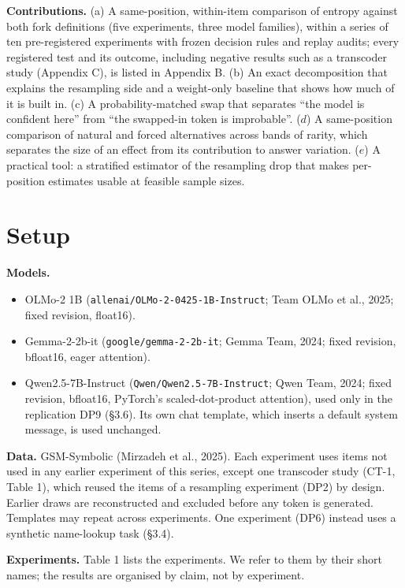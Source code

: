 \documentclass[
  10pt,
  a4paper,
]{article}
\providecommand{\tightlist}{%
  \setlength{\itemsep}{0pt}\setlength{\parskip}{0pt}}
\begin{document}
\textbf{Contributions.} (a) A same-position, within-item comparison of entropy against both fork definitions (five experiments, three model families), within a series of ten pre-registered experiments
with frozen decision rules and replay audits; every registered test and its outcome, including negative results such as a transcoder study (Appendix C), is listed in Appendix B. (b) An exact
decomposition that explains the resampling side and a weight-only baseline that shows how much of it is built in. (c) A probability-matched swap that separates ``the model is confident here'' from
``the swapped-in token is improbable''. (\(d\)) A same-position comparison of natural and forced alternatives across bands of rarity, which separates the size of an effect from its contribution to
answer variation. (\(e\)) A practical tool: a stratified estimator of the resampling drop that makes per-position estimates usable at feasible sample sizes.

\hypertarget{setup}{%
\section{Setup}\label{setup}}

\textbf{Models.}

\begin{itemize}
\tightlist
\item
  OLMo-2 1B (\texttt{allenai/OLMo-2-0425-1B-Instruct}; Team OLMo et al., 2025; fixed revision, float16).
\item
  Gemma-2-2b-it (\texttt{google/gemma-2-2b-it}; Gemma Team, 2024; fixed revision, bfloat16, eager attention).
\item
  Qwen2.5-7B-Instruct (\texttt{Qwen/Qwen2.5-7B-Instruct}; Qwen Team, 2024; fixed revision, bfloat16, PyTorch's scaled-dot-product attention), used only in the replication DP9 (§3.6). Its own chat
  template, which inserts a default system message, is used unchanged.
\end{itemize}

\textbf{Data.} GSM-Symbolic (Mirzadeh et al., 2025). Each experiment uses items not used in any earlier experiment of this series, except one transcoder study (CT-1, Table 1), which reused the items
of a resampling experiment (DP2) by design. Earlier draws are reconstructed and excluded before any token is generated. Templates may repeat across experiments. One experiment (DP6) instead uses a
synthetic name-lookup task (§3.4).

\textbf{Experiments.} Table 1 lists the experiments. We refer to them by their short names; the results are organised by claim, not by experiment.
\end{document}
